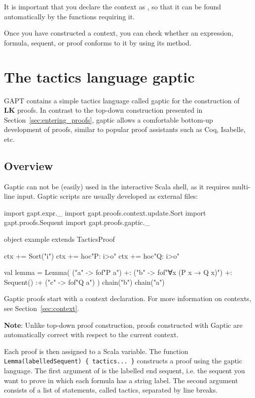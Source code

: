 \documentclass[a4paper,11pt]{book}
\newcommand{\LK}{\textbf{LK}}
\newcommand{\cli}[1]{{\ttfamily {#1}}}
\begin{document}
It is important that you declare the context as \cli{implicit}, so that it can be found automatically
by the functions requiring it.

Once you have constructed a context, you can check whether an expression, formula, sequent, or proof conforms to it by using its \cli{check} method.

\section{The tactics language gaptic}\label{sec:gaptic}

GAPT contains a simple tactics language called gaptic for the construction of {\LK} proofs.
In contrast to the top-down construction presented in Section~\ref{sec:entering_proofs},
gaptic allows a comfortable bottom-up development of proofs, similar
to popular proof assistants such as Coq, Isabelle, etc.

\subsection{Overview}

Gaptic can not be (easily) used in the interactive Scala shell, as it requires
multi-line input.  Gaptic scripts are usually developed as external files:
\begin{tacticslisting}
import gapt.expr._
import gapt.proofs.context.update.Sort
import gapt.proofs.Sequent
import gapt.proofs.gaptic._

object example extends TacticsProof {
  ctx += Sort("i")
  ctx += hoc"P: i>o"
  ctx += hoc"Q: i>o"

  val lemma = Lemma(
    ("a" -> fof"P a") +:
    ("b" -> fof"∀x (P x → Q x)") +:
    Sequent()
    :+ ("c" -> fof"Q a")
  ) {
    chain("b")
    chain("a")
  }
}
\end{tacticslisting}
\begin{tacticsoutput}
\end{tacticsoutput}

Gaptic proofs start with a context declaration. For more information on
contexts, see Section~\ref{sec:context}.

\textbf{Note}: Unlike top-down proof construction, proofs constructed with Gaptic
are automatically correct with respect to the current context.

Each proof is then assigned to a Scala variable.  The function
\verb,Lemma(labelledSequent) { tactics... }, constructs a proof using the
gaptic language.  The first argument of \cli{Lemma} is the labelled end
sequent, i.e. the sequent you want to prove in which each formula has a string
label.  The second argument consists of a list of statements, called tactics,
separated by line breaks.
\end{document}
